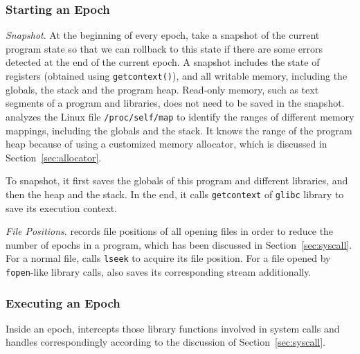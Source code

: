 \subsubsection{Starting an Epoch}
{\em Snapshot}. 
At the beginning of every epoch, \doubletake{} take a snapshot of the current program state 
so that we can rollback to this state if there are some errors detected at the end of the current epoch.
A snapshot includes the state of registers (obtained using \texttt{getcontext()}),
and all writable memory, including the globals, the stack and the program heap. 
Read-only memory, such as text segments of a program and libraries, does not need to 
be saved in the snapshot. \doubletake{} analyzes the Linux file \texttt{/proc/self/map} 
to identify the ranges of different memory mappings, including the globals and the stack.
It knows the range of the program heap because of using a customized memory allocator, which is discussed in
Section~\ref{sec:allocator}.  

To snapshot, it first saves the globals of this program and different libraries, 
and then the heap and the stack. 
In the end, it calls \texttt{getcontext} of \texttt{glibc} library to save its execution context.

{\em File Positions}. \doubletake{} records file positions of all opening files
in order to reduce the number of epochs in a program, 
which has been discussed in Section~\ref{sec:syscall}.
For a normal file, \doubletake{} calls \texttt{lseek} to acquire its file position.
For a file opened by \texttt{fopen}-like library calls,
\doubletake{} also saves its corresponding stream additionally.

\subsubsection{Executing an Epoch}
\label{sec:inepoch}
Inside an epoch, \doubletake{} intercepts those library functions involved in system calls 
and handles correspondingly according to the discussion of Section~\ref{sec:syscall}.


